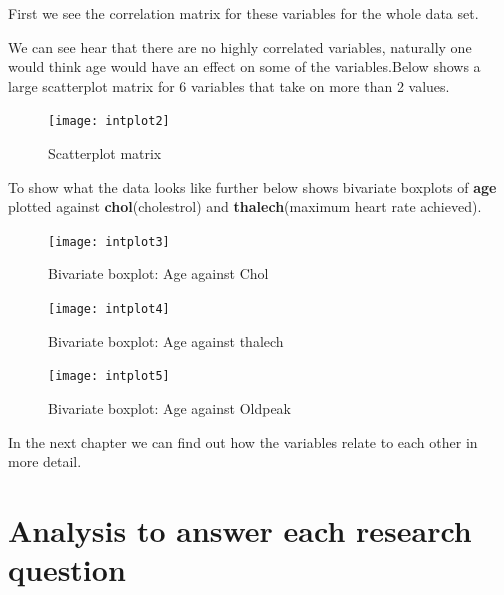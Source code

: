 \documentclass[a4paper]{article}
\begin{document}
First we see the correlation matrix for these variables for the whole data set.


We can see hear that there are no highly correlated variables, naturally one would think age would have an effect on some of the variables.Below shows a large scatterplot matrix for 6 variables that take on more than 2 values.

\begin{figure}[H]
	\begin{center}
		\texttt{[image: intplot2]}
	\end{center}
	\caption{Scatterplot matrix}
\end{figure}

To show what the data looks like further below shows bivariate boxplots of \textbf{age} plotted against \textbf{chol}(cholestrol) and \textbf{thalech}(maximum heart rate achieved).

\begin{figure}[H]
	\begin{center}
		\texttt{[image: intplot3]}
	\end{center}
	\caption{Bivariate boxplot: Age against Chol}
\end{figure}

\begin{figure}[H]
	\begin{center}
		\texttt{[image: intplot4]}
	\end{center}
	\caption{Bivariate boxplot: Age against thalech}
\end{figure}

\begin{figure}[H]
	\begin{center}
		\texttt{[image: intplot5]}
	\end{center}
	\caption{Bivariate boxplot: Age against Oldpeak}
\end{figure}


In the next chapter we can find out how the variables relate to each other in more detail.

\section{Analysis to answer each research question}
\end{document}
